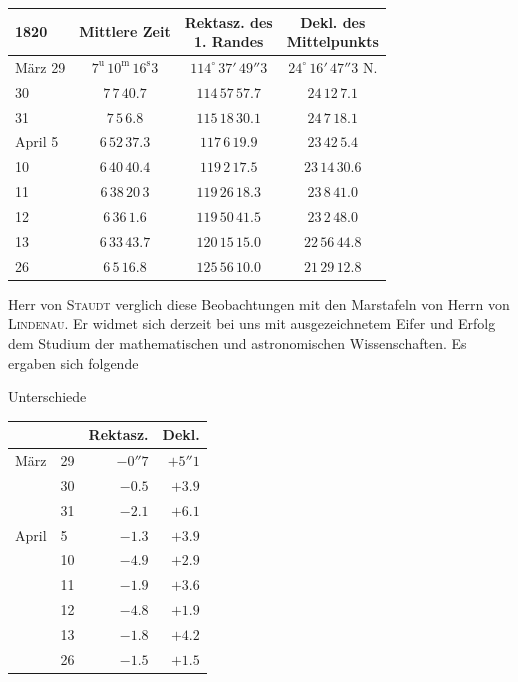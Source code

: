 \begin{center}
\begin{tabular}{l|c|c|c}
1820 & Mittlere Zeit & \shortstack{Rektasz. des\\1. Randes} & \shortstack{Dekl. des\\Mittelpunkts} \\
\hline
März 29 & $7^{\mathrm u}\,10^{\mathrm m}\,16^{\mathrm s}3$ & $114^\circ\,37'\,49''3$ & $24^\circ\,16'\,47''3$ N. \\
30 & $7\,7\,40.7$ & $114\,57\,57.7$ & $24\,12\,7.1$ \\
31 & $7\,5\,6.8$ & $115\,18\,30.1$ & $24\,7\,18.1$ \\
April 5 & $6\,52\,37.3$ & $117\,6\,19.9$ & $23\,42\,5.4$ \\
10 & $6\,40\,40.4$ & $119\,2\,17.5$ & $23\,14\,30.6$ \\
11 & $6\,38\,20\,3$ & $119\,26\,18.3$ & $23\,8\,41.0$ \\
12 & $6\,36\,1.6$ & $119\,50\,41.5$ & $23\,2\,48.0$ \\
13 & $6\,33\,43.7$ & $120\,15\,15.0$ & $22\,56\,44.8$ \\
26 & $6\,5\,16.8$ & $125\,56\,10.0$ & $21\,29\,12.8$ \\
\end{tabular}
\end{center}

Herr von \textsc{Staudt} verglich diese Beobachtungen mit den Marstafeln von Herrn von \textsc{Lindenau}. Er widmet sich derzeit bei uns mit ausgezeichnetem Eifer und Erfolg dem Studium der mathematischen und astronomischen Wissenschaften. Es ergaben sich folgende

\begin{center}
Unterschiede

\begin{tabular}{ll|r|r}
 & & Rektasz. & Dekl. \\
\hline
März & 29 & $-0''7$ & $+5''1$ \\
 & 30 & $-0.5$ & $+3.9$ \\
 & 31 & $-2.1$ & $+6.1$ \\
April & 5 & $-1.3$ & $+3.9$ \\
 & 10 & $-4.9$ & $+2.9$ \\
 & 11 & $-1.9$ & $+3.6$ \\
 & 12 & $-4.8$ & $+1.9$ \\
 & 13 & $-1.8$ & $+4.2$ \\
 & 26 & $-1.5$ & $+1.5$ \\
\end{tabular}
\end{center}
